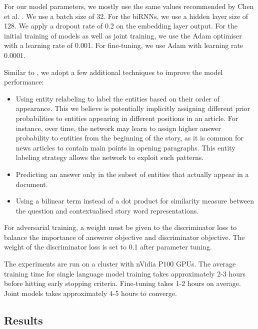 \documentclass[]{article}
\begin{document}
For our model parameters, we mostly use the same values recommended by Chen et al. \cite{chen2016thorough}. We use a batch size of 32. For the biRNNs, we use a hidden layer size of 128. We apply a dropout rate of 0.2 on the embedding layer output. For the initial training of models as well as joint training, we use the Adam optimiser \cite{kingma2014adam} with a learning rate of 0.001. For fine-tuning, we use Adam with learning rate 0.0001. 

Similar to \cite{chen2016thorough}, we adopt a few additional techniques to improve the model performance: 
\begin{itemize}
	\item Using entity relabeling to label the entities based on their order of appearance. This we believe is potentially implicitly assigning different prior probabilities to entities appearing in different positions in an article. For instance, over time, the network may learn to assign higher answer probability to entities from the beginning of the story, as it is common for news articles to contain main points in opening paragraphs. This entity labeling strategy allows the network to exploit such patterns.
	\item Predicting an answer only in the subset of entities that actually appear in a document.
	\item Using a bilinear term instead of a dot product for similarity measure between the question and contextualised story word representations.
\end{itemize}

For adversarial training, a weight must be given to the discriminator loss to balance the importance of answerer objective and discriminator objective. The weight of the discriminator loss is set to 0.1 after parameter tuning.

The experiments are run on a cluster with nVidia P100 GPUs. The average training time for single language model training takes approximately 2-3 hours before hitting early stopping criteria. Fine-tuning takes 1-2 hours on average. Joint models takes approximately 4-5 hours to converge.

\subsection{Results}
\end{document}
